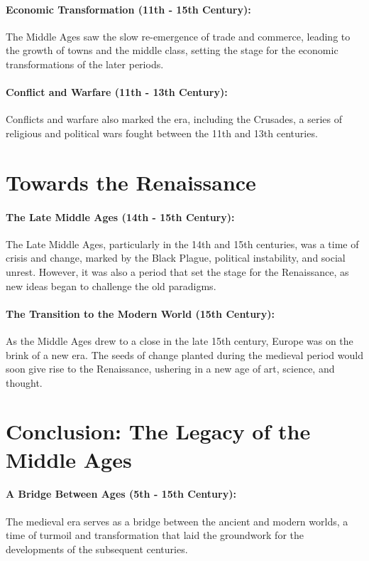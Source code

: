 \documentclass{book}
\begin{document}
\paragraph{Economic Transformation (11th - 15th Century):}
The Middle Ages saw the slow re-emergence of trade and commerce, leading to the growth of towns and the middle class, setting the stage for the economic transformations of the later periods.

\paragraph{Conflict and Warfare (11th - 13th Century):}
Conflicts and warfare also marked the era, including the Crusades, a series of religious and political wars fought between the 11th and 13th centuries.

\section*{Towards the Renaissance}

\paragraph{The Late Middle Ages (14th - 15th Century):}
The Late Middle Ages, particularly in the 14th and 15th centuries, was a time of crisis and change, marked by the Black Plague, political instability, and social unrest. However, it was also a period that set the stage for the Renaissance, as new ideas began to challenge the old paradigms.

\paragraph{The Transition to the Modern World (15th Century):}
As the Middle Ages drew to a close in the late 15th century, Europe was on the brink of a new era. The seeds of change planted during the medieval period would soon give rise to the Renaissance, ushering in a new age of art, science, and thought.

\section*{Conclusion: The Legacy of the Middle Ages}

\paragraph{A Bridge Between Ages (5th - 15th Century):}
The medieval era serves as a bridge between the ancient and modern worlds, a time of turmoil and transformation that laid the groundwork for the developments of the subsequent centuries.
\end{document}
